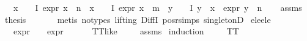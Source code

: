 \begin{isabellebody}
\ \ \ {\isachardoublequoteopen}{\isasymforall}x\ {\isasymin}\ {\isacharparenleft}{\kern0pt}{\isasymPhi}\ {\isacharbackquote}{\kern0pt}\ I{\isacharparenright}{\kern0pt}{\isachardot}{\kern0pt}\ expr{\isacharunderscore}{\kern0pt}{}\ x\ {\isasymle}\ n\ {\isasymor}\ {\isacharparenleft}{\kern0pt}{\isasymexists}x\ {\isasymin}\ {\isasymPhi}\ {\isacharbackquote}{\kern0pt}\ I{\isachardot}{\kern0pt}\ expr{\isacharunderscore}{\kern0pt}{}\ x\ {\isasymle}\ m\ {\isasymand}\ {\isacharparenleft}{\kern0pt}{\isasymforall}y\ {\isasymin}\ {\isasymPhi}\ {\isacharbackquote}{\kern0pt}\ I{\isachardot}{\kern0pt}\ y\ {\isasymnoteq}\ x\ {\isasymlongrightarrow}\ expr{\isacharunderscore}{\kern0pt}{}\ y\ {\isasymle}\ n{\isacharparenright}{\kern0pt}{\isacharparenright}{\kern0pt}{\isachardoublequoteclose}\isanewline
%
\isadelimproof
%
\endisadelimproof
%
\isatagproof
{}\isamarkupfalse%
{\isacharminus}{\kern0pt}\isanewline
\ \ \isamarkupfalse%
\ assms\ \isamarkupfalse%
\ {\isacharquery}{\kern0pt}thesis\ \isanewline
\ \ \ \ \isamarkupfalse%
\ {\isacharparenleft}{\kern0pt}metis\ {\isacharparenleft}{\kern0pt}no{\isacharunderscore}{\kern0pt}types{\isacharcomma}{\kern0pt}\ lifting{\isacharparenright}{\kern0pt}\ DiffI\ pos{\isacharunderscore}{\kern0pt}r{\isachardot}{\kern0pt}simps\ singletonD{\isacharparenright}{\kern0pt}\isanewline
{}\isamarkupfalse%
%
\endisatagproof
{\isafoldproof}%
%
\isadelimproof
\isanewline
%
\endisadelimproof
\isanewline
{}\isamarkupfalse%
\ e{}{\isacharunderscore}{\kern0pt}le{\isacharunderscore}{\kern0pt}{}{\isacharunderscore}{\kern0pt}e{}{\isacharunderscore}{\kern0pt}le{\isacharunderscore}{\kern0pt}{}{\isacharcolon}{\kern0pt}\isanewline
\ \ \ {\isachardoublequoteopen}expr{\isacharunderscore}{\kern0pt}{}\ {\isasymphi}\ {\isasymle}\ {}{\isachardoublequoteclose}\ {\isachardoublequoteopen}expr{\isacharunderscore}{\kern0pt}{}\ {\isasymphi}\ {\isasymle}\ {}{\isachardoublequoteclose}\isanewline
\ \ \ {\isachardoublequoteopen}TT{\isacharunderscore}{\kern0pt}like\ {\isasymphi}{\isachardoublequoteclose}\isanewline
%
\isadelimproof
\ \ %
\endisadelimproof
%
\isatagproof
{}\isamarkupfalse%
\ assms\ \isamarkupfalse%
{\isacharparenleft}{\kern0pt}induction\ {\isasymphi}{\isacharparenright}{\kern0pt}\isanewline
\ \ \isamarkupfalse%
\ TT\isanewline
\ \ \isamarkupfalse%

\end{isabellebody}

